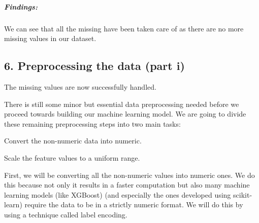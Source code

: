 \documentclass[11pt]{article}
\begin{document}
    
    \hypertarget{findings}{%
\subparagraph{Findings:}\label{findings}}

We can see that all the missing have been taken care of as there are no
more missing values in our dataset.

    \hypertarget{preprocessing-the-data-part-i}{%
\subsection{6. Preprocessing the data (part
i)}\label{preprocessing-the-data-part-i}}

The missing values are now successfully handled.

There is still some minor but essential data preprocessing needed before
we proceed towards building our machine learning model. We are going to
divide these remaining preprocessing steps into two main tasks:

Convert the non-numeric data into numeric.

Scale the feature values to a uniform range.

First, we will be converting all the non-numeric values into numeric
ones. We do this because not only it results in a faster computation but
also many machine learning models (like XGBoost) (and especially the
ones developed using scikit-learn) require the data to be in a strictly
numeric format. We will do this by using a technique called label
encoding.
\end{document}
